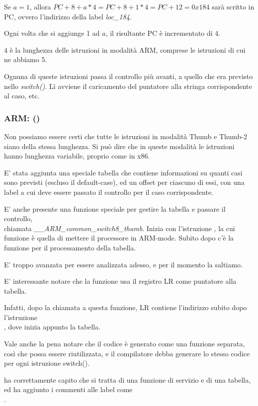 Se $a=1$, allora $PC+8+a*4 = PC+8+1*4 = PC+12 = 0x184$ sarà scritto in \ac{PC}, ovvero l'indirizzo della label \emph{loc\_184}.

Ogni volta che si aggiunge 1 ad $a$, il risultante \ac{PC} è incrementato di 4.

4 è la lunghezza delle istruzioni in modalità ARM, comprese le istruzioni  di cui ne abbiamo 5.

Ognuna di queste istruzioni  passa il controllo più avanti, a quello che era previsto nello \emph{switch()}.
Lì avviene il caricamento del puntatore alla stringa corrispondente al caso, etc.

\subsubsection{ARM: \OptimizingKeilVI (\ThumbMode)}




Non possiamo essere certi che tutte le istruzioni in modalità Thumb e Thumb-2 siano della stessa lunghezza. Si può dire
che in queste modalità le istruzioni hanno lunghezza variabile, proprio come in x86.


E' stata aggiunta una speciale tabella che contiene informazioni su quanti casi sono previsti (escluso il default-case),
ed un offset per ciascuno di essi, con una label a cui deve essere passato il controllo per il caso corrispondente.



E' anche presente una funzione speciale per gestire la tabella e passare il controllo, \\
chiamata \emph{\_\_ARM\_common\_switch8\_thumb}. 
Inizia con l'istruzione , la cui funzione è quella di mettere il processore in ARM-mode.
Subito dopo c'è la funzione per il processamento della tabella.

E' troppo avanzata per essere analizzata adesso, e per il momento la saltiamo.


E' interessante notare che la funzione usa il registro \ac{LR} come puntatore alla tabella.

Infatti, dopo la chiamata a questa funzione, \ac{LR} contiene l'indirizzo subito dopo l'istruzione\\
, dove inizia appunto la tabella.

Vale anche la pena notare che il codice è generato come una funzione separata, così che possa essere riutilizzata, e il compilatore
debba generare lo stesso codice per ogni istruzione switch().

\IDA ha correttamente capito che si tratta di una funzione di servizio e di una tabella, ed ha aggiunto i commenti alle label come\\
.

